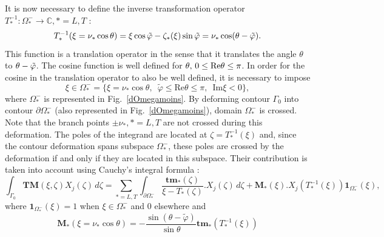 It is now necessary to define the inverse transformation operator $T_*^{-1}:\Omega_*^-\rightarrow \mathbb{C}, *=L,T$ :
\begin{equation}
T_*^{-1}(\xi=\nu_*\cos\theta)=\xi \cos \tilde{\varphi}-\zeta_*(\xi)\sin\tilde{\varphi}=\nu_*\cos(\theta-\tilde{\varphi}).
\end{equation}
This function is a translation operator in the sense that it translates the angle $\theta$ to $\theta-\tilde{\varphi}$. The cosine function is well defined for $\theta, \, 0\leq \rm Re \theta \leq \pi$. In order for the cosine in the translation operator to also be well defined, it is necessary to impose
\begin{equation}
\xi \in \Omega_*^-=\{\xi=\nu_*\cos\theta, \, \, \, \tilde{\varphi}\leq \mbox{Re}\theta\leq\pi, \, \, \, \mbox{Im}\xi< 0\},
\end{equation}
where $\Omega_*^-$ is represented in Fig.~\ref{dOmegamoins}. By deforming contour $\Gamma_0$ into contour $\partial \Omega_*^-$ (also represented in Fig.~\ref{dOmegamoins}), domain $\Omega_*^-$ is crossed. Note that the branch points $\pm \nu_*, *=L,T$ are not crossed during this deformation. The poles of the integrand are located at $\zeta=T_*^{-1}(\xi)$ and, since the contour deformation spans subspace $\Omega_*^-$, these poles are crossed by the deformation if and only if they are located in this subspace. Their contribution is taken into account using Cauchy's integral formula :
\begin{equation}
\int_{\Gamma_0} \textbf{TM}(\xi,\zeta)X_j(\zeta)\, d\zeta = \sum_{*=L,T}\int_{\partial \Omega_*^-}  \dfrac{\textbf{tm}_*(\zeta)}{\xi-T_*(\zeta)}.X_j(\zeta)\, d\zeta+ \mathbf{M}_*(\xi).X_j(T^{-1}_*(\xi))\textbf{1}_{\Omega_*^-}(\xi),
\label{TM2}
\end{equation}
where $\textbf{1}_{\Omega_*^-}(\xi)=1$ when $\xi \in \Omega_*^-$ and $0$ elsewhere and
\begin{equation}
\mathbf{M}_*(\xi=\nu_*\cos\theta)=-\frac{\sin(\theta-\tilde{\varphi})}{\sin\theta} \textbf{tm}_*(T_*^{-1}(\xi))
\end{equation}

